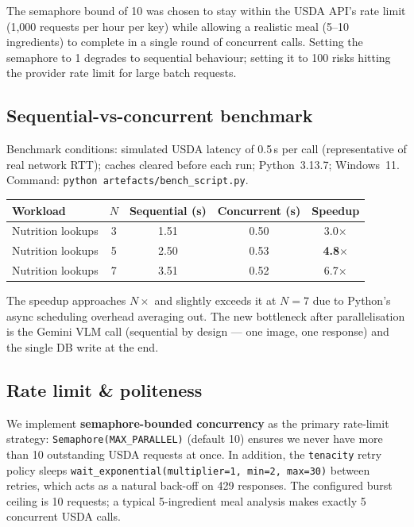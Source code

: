 \documentclass[11pt,a4paper]{article}
\begin{document}
The semaphore bound of 10 was chosen to stay within the USDA API's rate limit (1,000 requests per hour per key) while allowing a realistic meal (5--10 ingredients) to complete in a single round of concurrent calls.
Setting the semaphore to 1 degrades to sequential behaviour; setting it to 100 risks hitting the provider rate limit for large batch requests.

\subsection{Sequential-vs-concurrent benchmark}

Benchmark conditions: simulated USDA latency of 0.5\,s per call (representative of real network RTT); caches cleared before each run; Python~3.13.7; Windows~11.
Command: \texttt{python artefacts/bench\_script.py}.

\begin{center}\small
\begin{tabular}{lcccc}
\toprule
\textbf{Workload} & $N$ & \textbf{Sequential (s)} & \textbf{Concurrent (s)} & \textbf{Speedup} \\
\midrule
Nutrition lookups & 3 & 1.51 & 0.50 & 3.0$\times$ \\
Nutrition lookups & 5 & 2.50 & 0.53 & \textbf{4.8$\times$} \\
Nutrition lookups & 7 & 3.51 & 0.52 & 6.7$\times$ \\
\bottomrule
\end{tabular}
\end{center}

The speedup approaches $N\times$ and slightly exceeds it at $N=7$ due to Python's async scheduling overhead averaging out.
The new bottleneck after parallelisation is the Gemini VLM call (sequential by design --- one image, one response) and the single DB write at the end.

\subsection{Rate limit \& politeness}

We implement \textbf{semaphore-bounded concurrency} as the primary rate-limit strategy: \texttt{Semaphore(MAX\_PARALLEL)} (default 10) ensures we never have more than 10 outstanding USDA requests at once.
In addition, the \texttt{tenacity} retry policy sleeps \texttt{wait\_exponential(multiplier=1, min=2, max=30)} between retries, which acts as a natural back-off on 429 responses.
The configured burst ceiling is 10 requests; a typical 5-ingredient meal analysis makes exactly 5 concurrent USDA calls.
\end{document}
